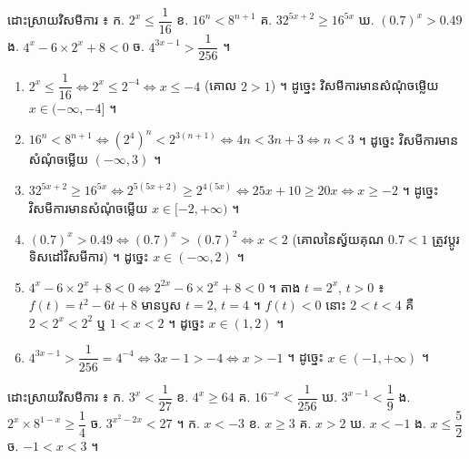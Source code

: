 \begin{example}[លំហាត់គំរូ]
ដោះស្រាយវិសមីការ ៖ \quad ក. $2^x \le \dfrac{1}{16}$ \quad ខ. $16^n < 8^{n+1}$ \quad គ. $32^{5x+2} \ge 16^{5x}$ \quad ឃ. $(0.7)^x > 0.49$ \quad ង. $4^x - 6\times 2^x + 8 < 0$ \quad ច. $4^{3x-1} > \dfrac{1}{256}$ ។
\ans
\begin{enumerate}[a]
  \item $2^x \le \dfrac{1}{16} \Leftrightarrow 2^x \le 2^{-4} \Leftrightarrow x \le -4$ (គោល $2 > 1$) ។ ដូច្នេះ វិសមីការមានសំណុំចម្លើយ $x \in (-\infty, -4]$ ។
  \item $16^n < 8^{n+1} \Leftrightarrow (2^4)^n < 2^{3(n+1)} \Leftrightarrow 4n < 3n + 3 \Leftrightarrow n < 3$ ។ ដូច្នេះ វិសមីការមានសំណុំចម្លើយ $(-\infty, 3)$ ។
  \item $32^{5x+2} \ge 16^{5x} \Leftrightarrow 2^{5(5x+2)} \ge 2^{4(5x)} \Leftrightarrow 25x + 10 \ge 20x \Leftrightarrow x \ge -2$ ។ ដូច្នេះ វិសមីការមានសំណុំចម្លើយ $x \in [-2, +\infty)$ ។
  \item $(0.7)^x > 0.49 \Leftrightarrow (0.7)^x > (0.7)^2 \Leftrightarrow x < 2$ (គោលនៃស្វ័យគុណ $0.7 < 1$ ត្រូវប្ដូរទិសដៅវិសមីការ) ។ ដូច្នេះ $x \in (-\infty, 2)$ ។
  \item $4^x - 6\times 2^x + 8 < 0 \Leftrightarrow 2^{2x} - 6\times 2^x + 8 < 0$ ។ តាង $t = 2^x$, $t > 0$ ៖ $f(t) = t^2 - 6t + 8$ មានឫស $t = 2$, $t = 4$ ។ $f(t) < 0$ នោះ $2 < t < 4$ គឺ $2 < 2^x < 2^2$ ឬ $1 < x < 2$ ។ ដូច្នេះ $x \in (1, 2)$ ។
  \item $4^{3x-1} > \dfrac{1}{256} = 4^{-4} \Leftrightarrow 3x - 1 > -4 \Leftrightarrow x > -1$ ។ ដូច្នេះ $x \in (-1, +\infty)$ ។
\end{enumerate}
\end{example}

\begin{pro}
ដោះស្រាយវិសមីការ ៖ \quad ក. $3^x < \dfrac{1}{27}$ \quad ខ. $4^x \ge 64$ \quad គ. $16^{-x} < \dfrac{1}{256}$ \quad ឃ. $3^{x-1} < \dfrac{1}{9}$ \quad ង. $2^x\times 8^{1-x} \ge \dfrac{1}{4}$ \quad ច. $3^{x^2-2x} < 27$ ។
\ans
ក. $x < -3$ \quad ខ. $x \ge 3$ \quad គ. $x > 2$ \quad ឃ. $x < -1$ \quad ង. $x \le \dfrac{5}{2}$ \quad ច. $-1 < x < 3$ ។
\end{pro}


